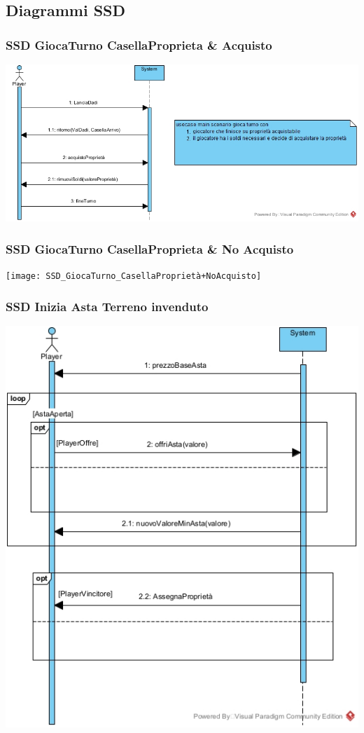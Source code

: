 \documentclass{article}
\begin{document}
\subsection{Diagrammi SSD}
\subsubsection{SSD GiocaTurno CasellaProprieta \& Acquisto}
\includegraphics[width=\textwidth]{SSD_GiocaTurno_CasellaProprieta+Acquisto}
\subsubsection{SSD GiocaTurno CasellaProprieta \& No Acquisto}
\texttt{[image: SSD\_GiocaTurno\_CasellaProprietà+NoAcquisto]}
\subsubsection{SSD Inizia Asta Terreno invenduto}
\includegraphics[width=\textwidth]{SSD_IniziaAsta_Invenduta}
\end{document}

